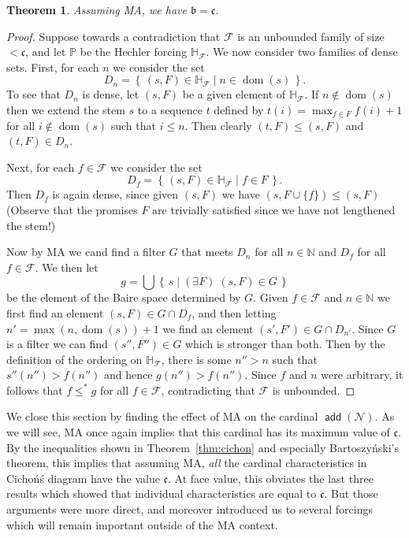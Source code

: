 \documentclass[11pt,oneside]{amsbook}
\newcommand{\set}[1]{\left\{\,#1\,\right\}}
\newcommand{\NN}{\mathbb N}
\newcommand{\PP}{\mathbb P}
\newcommand{\Null}{\mathcal N}
\DeclareMathOperator{\dom}{dom}
\DeclareMathOperator{\add}{\mathsf{add}}
\theoremstyle{definition}
\theoremstyle{plain}
\newtheorem{thm}{Theorem}[section]
\theoremstyle{definition}
\theoremstyle{remark}
\begin{document}
\begin{thm}
  Assuming MA, we have $\mathfrak b=\mathfrak c$.
\end{thm}

\begin{proof}
  Suppose towards a contradiction that $\mathcal F$ is an unbounded family of size $<\mathfrak c$, and let $\PP$ be the Hechler forcing $\mathbb H_{\mathcal F}$. We now consider two families of dense sets. First, for each $n$ we consider the set
  \[D_n=\set{(s,F)\in\mathbb H_{\mathcal F}\mid n\in\dom(s)}\text{.}
  \]
  To see that $D_n$ is dense, let $(s,F)$ be a given element of $\mathbb H_{\mathcal F}$. If $n\notin\dom(s)$ then we extend the stem $s$ to a sequence $t$ defined by $t(i)=\max_{f\in F}f(i)+1$ for all $i\notin\dom(s)$ such that $i\leq n$. Then clearly $(t,F)\leq(s,F)$ and $(t,F)\in D_n$.

  Next, for each $f\in\mathcal F$ we consider the set
  \[D_f=\set{(s,F)\in\mathbb H_{\mathcal F}\mid f\in F}\text{.}
  \]
  Then $D_f$ is again dense, since given $(s,F)$ we have $(s,F\cup\{f\})\leq(s,F)$ (Observe that the promises $F$ are trivially satisfied since we have not lengthened the stem!)

  Now by MA we cand find a filter $G$ that meets $D_n$ for all $n\in\NN$ and  $D_f$ for all $f\in\mathcal F$. We then let
  \[g=\bigcup\set{s\mid(\exists F)\;(s,F)\in G}
  \]
  be the element of the Baire space determined by $G$. Given $f\in\mathcal F$ and $n\in\NN$ we first find an element $(s,F)\in G\cap D_f$, and then letting $n'=\max(n,\dom(s))+1$ we find an element $(s',F')\in G\cap D_{n'}$. Since $G$ is a filter we can find $(s'',F'')\in G$ which is stronger than both. Then by the definition of the ordering on $\mathbb H_{\mathcal F}$, there is some $n''>n$ such that $s''(n'')>f(n'')$ and hence $g(n'')>f(n'')$. Since $f$ and $n$ were arbitrary, it follows that $f\leq^*g$ for all $f\in\mathcal F$, contradicting that $\mathcal F$ is unbounded.
\end{proof}

We close this section by finding the effect of MA on the cardinal $\add(\Null)$. As we will see, MA once again implies that this cardinal has its maximum value of $\mathfrak c$. By the inequalities shown in Theorem~\ref{thm:cichon} and especially Bartoszy\'nski's theorem, this implies that assuming MA, \emph{all} the cardinal characteristics in Cicho\'n\'s diagram have the value $\mathfrak c$. At face value, this obviates the last three results which showed that individual characteristics are equal to $\mathfrak c$. But those arguments were more direct, and moreover introduced us to several forcings which will remain important outside of the MA context.
\end{document}
